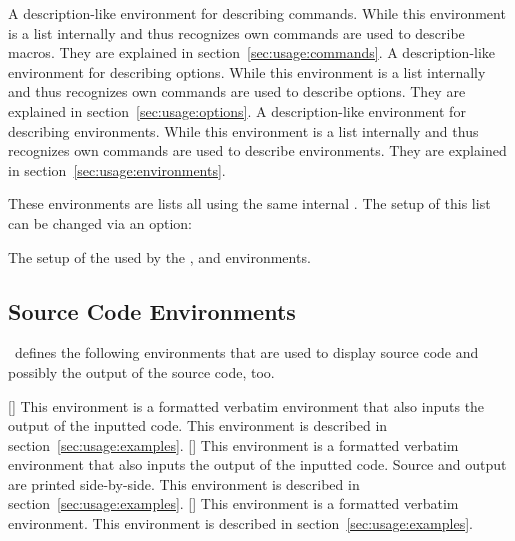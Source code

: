 \documentclass[load-preamble+]{cnltx-doc}
\begin{document}
\begin{environments}
    A description-like environment for describing commands.  While this
    environment is a list internally and thus recognizes  own
    commands are used to describe macros.  They are explained in
    section~\vref{sec:usage:commands}.
    A description-like environment for describing options.  While this
    environment is a list internally and thus recognizes  own
    commands are used to describe options.  They are explained in
    section~\vref{sec:usage:options}.
    A description-like environment for describing environments.  While this
    environment is a list internally and thus recognizes  own
    commands are used to describe environments.  They are explained in
    section~\vref{sec:usage:environments}.
\end{environments}

These environments are lists all using the same internal .  The
setup of this list can be changed via an option:

\begin{options}
    The setup of the  used by the ,  and
     environments.
\end{options}

\subsection{Source Code Environments}\label{sec:envs:sourcecode}
\cnltxexample\ defines the following environments that are used to display
source code and possibly the output of the source code, too.

\begin{environments}
  []
    This environment is a formatted verbatim environment that also inputs the
    output of the inputted code.  This environment is described in
    section~\vref{sec:usage:examples}.
  []
    This environment is a formatted verbatim environment that also inputs the
    output of the inputted code.  Source and output are printed side-by-side.
    This environment is described in section~\vref{sec:usage:examples}.
  []
    This environment is a formatted verbatim environment.  This environment is
    described in section~\vref{sec:usage:examples}.
\end{environments}
  
\end{document}
